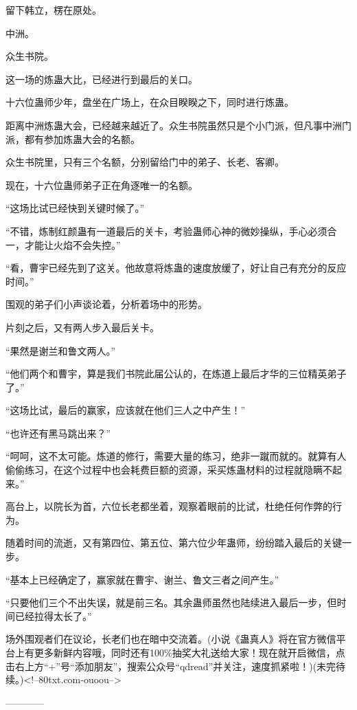 \begin{this_body}
留下韩立，楞在原处。

中洲。

众生书院。

这一场的炼蛊大比，已经进行到最后的关口。

十六位蛊师少年，盘坐在广场上，在众目睽睽之下，同时进行炼蛊。

距离中洲炼蛊大会，已经越来越近了。众生书院虽然只是个小门派，但凡事中洲门派，都有参加炼蛊大会的名额。

众生书院里，只有三个名额，分别留给门中的弟子、长老、客卿。

现在，十六位蛊师弟子正在角逐唯一的名额。

“这场比试已经快到关键时候了。”

“不错，炼制红颜蛊有一道最后的关卡，考验蛊师心神的微妙操纵，手心必须合一，才能让火焰不会失控。”

“看，曹宇已经先到了这关。他故意将炼蛊的速度放缓了，好让自己有充分的反应时间。”

围观的弟子们小声谈论着，分析着场中的形势。

片刻之后，又有两人步入最后关卡。

“果然是谢兰和鲁文两人。”

“他们两个和曹宇，算是我们书院此届公认的，在炼道上最后才华的三位精英弟子了。”

“这场比试，最后的赢家，应该就在他们三人之中产生！”

“也许还有黑马跳出来？”

“呵呵，这不太可能。炼道的修行，需要大量的练习，绝非一蹴而就的。就算有人偷偷练习，在这个过程中也会耗费巨额的资源，采买炼蛊材料的过程就隐瞒不起来。”

高台上，以院长为首，六位长老都坐着，观察着眼前的比试，杜绝任何作弊的行为。

随着时间的流逝，又有第四位、第五位、第六位少年蛊师，纷纷踏入最后的关键一步。

“基本上已经确定了，赢家就在曹宇、谢兰、鲁文三者之间产生。”

“只要他们三个不出失误，就是前三名。其余蛊师虽然也陆续进入最后一步，但时间已经拉得太长了。”

场外围观者们在议论，长老们也在暗中交流着。(小说《蛊真人》将在官方微信平台上有更多新鲜内容哦，同时还有100\%抽奖大礼送给大家！现在就开启微信，点击右上方“+”号“添加朋友”，搜索公众号“qdread”并关注，速度抓紧啦！)(未完待续。)<!--80txt.com-ouoou-->

------------

\end{this_body}

